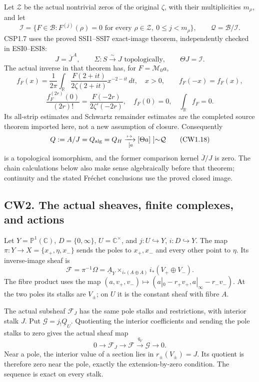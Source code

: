 Let \(\mathscr Z\) be the actual nontrivial zeros of the original
\(\zeta\), with their multiplicities \(m_\rho\), and let \[
\mathcal I=\{F\in\mathcal B:F^{(j)}(\rho)=0
\text{ for every }\rho\in\mathscr Z,\ 0\le j<m_\rho\},
\qquad \mathcal Q=\mathcal B/\mathcal I.
\tag{CW1.15}
\] CSP1.7 uses the proved SSI1--SSI7 exact-image theorem, independently
checked in ESI0--ESI8: \[
J=\overline J^{\,A},\qquad
\Sigma:S\xrightarrow{\sim}J\text{ topologically},\qquad
\Theta J=\mathcal I.
\tag{CW1.16}
\] The actual inverse in that theorem has, for \(F=\mathcal M_0a\), \[
f_F(x)=\frac1{2\pi}\int_{\mathbb R}
\frac{F(2+it)}{2\zeta(2+it)}x^{-2-it}\,dt,\quad x>0,\qquad
f_F(-x)=f_F(x),
\] \[
\frac{f_F^{(2r)}(0)}{(2r)!}
=\frac{F(-2r)}{2\zeta'(-2r)},\quad
f_F(0)=0,\quad \int_{\mathbb R}f_F=0.
\tag{CW1.17}
\] Its all-strip estimates and Schwartz remainder estimates are the
completed source theorem imported here, not a new assumption of closure.
Consequently \[
Q:=A/J=Q_{\rm alg}=Q_H
\xrightarrow[\ [a]\mapsto[\Theta a]\ ]{\sim}\mathcal Q
\tag{CW1.18}
\] is a topological isomorphism, and the former comparison kernel
\(\overline J/J\) is zero. The chain calculations below also make sense
algebraically before that theorem; continuity and the stated Fréchet
conclusions use the proved closed image.

\subsection{CW2. The actual sheaves, finite complexes, and
actions}\label{cw2.-the-actual-sheaves-finite-complexes-and-actions}

Let \(Y=\mathbb P^1(\mathbb C)\), \(D=\{0,\infty\}\),
\(U=\mathbb C^\times\), and \(j:U\hookrightarrow Y\),
\(i:D\hookrightarrow Y\). The map \(\pi:Y\to X=\{x_+,\eta,x_-\}\) sends
the poles to \(x_+,x_-\) and every other point to \(\eta\). Its
inverse-image sheaf is \[
\mathscr F=\pi^{-1}\Omega
=\underline A_Y\times_{i_*(A\oplus A)}i_*(V_+\oplus V_-).
\tag{CW2.1}
\] The fibre product uses the map
\((a,v_+,v_-)\mapsto(a|_0-r_+v_+,a|_\infty-r_-v_-)\). At the two poles
its stalks are \(V_\pm\); on \(U\) it is the constant sheaf with fibre
\(A\).

The actual subsheaf \(\mathscr F_J\) has the same pole stalks and
restrictions, with interior stalk \(J\). Put
\(\mathscr G=j_!\underline Q_U\). Quotienting the interior coefficients
and sending the pole stalks to zero gives the actual sheaf map \[
0\longrightarrow\mathscr F_J
\longrightarrow\mathscr F\xrightarrow{q_Y}\mathscr G
\longrightarrow0.
\tag{CW2.2}
\] Near a pole, the interior value of a section lies in
\(r_\pm(V_\pm)=J\). Its quotient is therefore zero near the pole,
exactly the extension-by-zero condition. The sequence is exact on every
stalk.

